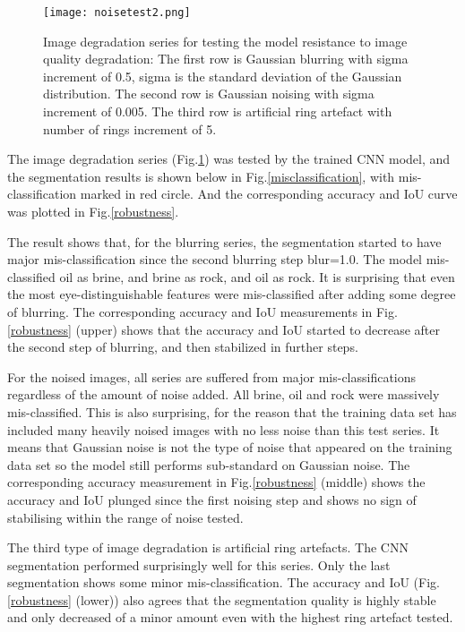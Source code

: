 \documentclass[draft,linenumbers]{agujournal2018}
\begin{document}
\begin{figure}[h]
 \centering
 \texttt{[image: noisetest2.png]}
 \caption{Image degradation series for testing the model resistance to image quality degradation: The first row is Gaussian blurring with sigma increment of 0.5, sigma is the standard deviation of the Gaussian distribution. The second row is Gaussian noising with sigma increment of 0.005. The third row is artificial ring artefact with number of rings increment of 5.}
 \label{noisetest}
 \end{figure}
 
 The image degradation series (Fig.\ref{noisetest}) was tested by the trained CNN model, and the segmentation results is shown below in Fig.\ref{misclassification}, with mis-classification marked in red circle. And the corresponding accuracy and IoU curve was plotted in Fig.\ref{robustness}.
 
 The result shows that, for the blurring series, the segmentation started to have major mis-classification since the second blurring step blur=1.0. The model mis-classified oil as brine, and brine as rock, and oil as rock. It is surprising that even the most eye-distinguishable features were mis-classified after adding some degree of blurring. The corresponding accuracy and IoU measurements in Fig.\ref{robustness} (upper) shows that the accuracy and IoU started to decrease after the second step of blurring, and then stabilized in further steps.
 
 For the noised images, all series are suffered from major mis-classifications regardless of the amount of noise added. All brine, oil and rock were massively mis-classified. This is also surprising, for the reason that the training data set has included many heavily noised images with no less noise than this test series. It means that Gaussian noise is not the type of noise that appeared on the training data set so the model still performs sub-standard on Gaussian noise. The corresponding accuracy measurement in Fig.\ref{robustness} (middle) shows the accuracy and IoU plunged since the first noising step and shows no sign of stabilising within the range of noise tested.
 
 The third type of image degradation is artificial ring artefacts. The CNN segmentation performed surprisingly well for this series. Only the last segmentation shows some minor mis-classification. The accuracy and IoU (Fig.\ref{robustness} (lower)) also agrees that the segmentation quality is highly stable and only decreased of a minor amount even with the highest ring artefact tested.
 
\end{document}
